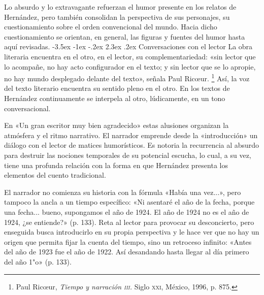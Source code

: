 \documentclass[14pt,twoside,final]{extbook} %
\makeatletter
\let\oldfootnote\footnote
\renewcommand\footnote[1]{%
\oldfootnote{\hspace{1mm}#1}}
\renewcommand\section{\@startsection {section}{1}{\z@}%
                                     {-3.5ex \@plus -1ex \@minus -.2ex}%
                                     {2.3ex \@plus .2ex}%
                                     {\normalfont\large\bfseries\sc}}
\makeatother
\begin{document}
Lo absurdo y lo extravagante refuerzan el humor presente en los relatos de Hernández, pero también consolidan la perspectiva de sus personajes, su cuestionamiento sobre el orden convencional del mundo. Hacia dicho cuestionamiento se orientan, en general, las figuras y fuentes del humor hasta aquí revisadas.
\section{Conversaciones con el lector}\label{sec:conversaciones-con-el-lector}
La obra literaria encuentra en el otro, en el lector, su complementariedad: «sin lector que lo acompañe, no hay acto configurador en el texto; y sin lector que se lo apropie, no hay mundo desplegado delante del texto», señala Paul Ric\oe ur.\footnote{Paul Ric\oe ur, \emph{Tiempo y narración \textsc{iii}.} Siglo \textsc{xxi}, México, 1996, p. 875.} Así, la voz del texto literario encuentra su sentido pleno en el otro. En los textos de Hernández continuamente se interpela al otro, lúdicamente, en un tono conversacional.

En «Un gran escritor muy bien agradecido» estas alusiones organizan la atmósfera y el ritmo narrativo. El narrador emprende desde la «introducción» un diálogo con el lector de matices humorísticos. Es notoria la recurrencia al absurdo para destruir las nociones temporales de su potencial escucha, lo cual, a su vez, tiene una profunda relación con la forma en que Hernández presenta los elementos del cuento tradicional.

El narrador no comienza su historia con la fórmula «Había una vez...», pero tampoco la ancla a un tiempo específico: «Ni asentaré el año de la fecha, porque una fecha... bueno, supongamos el año de 1924. El año de 1924 no es el año de 1924, ¿se entiende?» (p. 133). Reta al lector para provocar su
desconcierto, pero enseguida busca introducirlo en su propia perspectiva y le hace ver que no hay un origen que permita fijar la cuenta del tiempo, sino un retroceso infinito: «Antes del año de 1923 fue el año de 1922. Así desandando hasta llegar al día primero del año 1"o» (p. 133).
\end{document}
